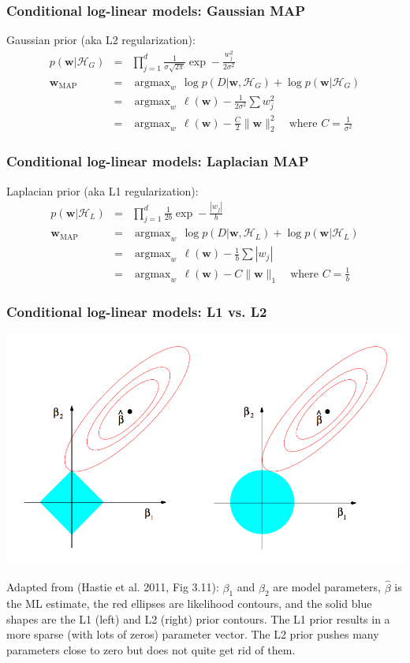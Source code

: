 \documentclass[ignorenonframetext,plain]{beamer}
\DeclareMathOperator*{\argmax}{argmax}
\begin{document}
\begin{frame}\frametitle{Conditional log-linear models: Gaussian MAP} %
Gaussian prior (aka L2 regularization):\begin{eqnarray*}
p(\mathbf{w}|\mathcal{H}_G) &=& \prod_{j=1}^d \frac{1}{\sigma \sqrt{2\pi}}
\exp -\frac{w_j^2}{2\sigma^2} \\
\mathbf{w}_\text{MAP} &=& \argmax_w\, \log p(D|\mathbf{w},\mathcal{H}_G)
+ \log p(\mathbf{w}|\mathcal{H}_G) \\
&=& \argmax_w\, \ell(\mathbf{w}) -\frac{1}{2\sigma^2}\sum w_j^2 \\
&=& \argmax_w\, \ell(\mathbf{w}) - \frac{C}{2}\|\mathbf{w}\|_2^2 \quad\text{where }C=\frac{1}{\sigma^2}
\end{eqnarray*}
\end{frame}
\begin{frame}\frametitle{Conditional log-linear models: Laplacian MAP} %
Laplacian prior (aka L1 regularization):\begin{eqnarray*}
p(\mathbf{w}|\mathcal{H}_L) &=& \prod_{j=1}^d \frac{1}{2b} \exp -\frac{|w_j|}{b}\\
\mathbf{w}_\text{MAP} &=& \argmax_w\, \log p(D|\mathbf{w},\mathcal{H}_L)
+ \log p(\mathbf{w}|\mathcal{H}_L) \\
&=& \argmax_w\, \ell(\mathbf{w}) -\frac{1}{b}\sum |w_j| \\
&=& \argmax_w\, \ell(\mathbf{w}) - C \|\mathbf{w}\|_1 \quad\text{where }C=\frac{1}{b}
\end{eqnarray*}
\end{frame}

\begin{frame}\frametitle{Conditional log-linear models: L1 vs. L2} %
\includegraphics[width=.9\textwidth]{images/hastie-fig-3-11.png}

\footnotesize Adapted from (Hastie et al. 2011, Fig 3.11): $\beta_1$
and $\beta_2$ are model parameters, $\hat{\beta}$ is the ML estimate,
the red ellipses are likelihood contours, and the solid blue shapes
are the L1 (left) and L2 (right) prior contours.  The L1 prior results
in a more sparse (with lots of zeros) parameter vector.  The L2 prior
pushes many parameters close to zero but does not quite get rid of
them.
\end{frame}
\end{document}
